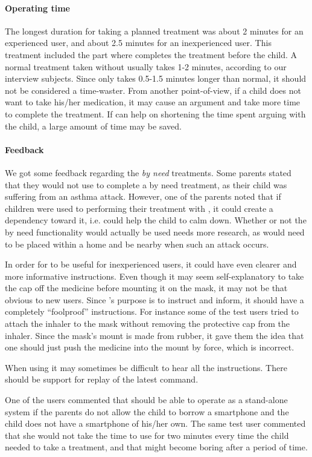 \paragraph{Operating time}

The longest duration for taking a planned treatment was about 2 minutes for an experienced user, and about 2.5 minutes for an inexperienced user. This treatment included the part where \buddy{} completes the treatment before the child. A normal treatment taken without \ab{} usually takes 1-2 minutes, according to our interview subjects. Since \ab{} only takes 0.5-1.5 minutes longer than normal, it should not be considered a time-waster. From another point-of-view, if a child does not want to take his/her medication, it may cause an argument and take more time to complete the treatment. If \ab{} can help on shortening the time spent arguing with the child, a large amount of time may be saved.      

\paragraph{Feedback}

We got some feedback regarding the \emph{by need} treatments. Some parents stated that they would not use \buddy{} to complete a by need treatment, as their child was suffering from an asthma attack. However, one of the parents noted that if children were used to performing their treatment with \buddy{}, it could create a dependency toward it, i.e. \buddy{} could help the child to calm down. Whether or not the by need functionality would actually be used needs more research, as \buddy{} would need to be placed within a home and be nearby when such an attack occurs. 

In order for \ab{} to be useful for inexperienced users, it could have even clearer and more informative instructions. Even though it may seem self-explanatory to take the cap off the medicine before mounting it on the mask, it may not be that obvious to new users. Since \ab{}'s purpose is to instruct and inform, it should have a completely ``foolproof'' instructions. For instance some of the test users tried to attach the inhaler to the mask without removing the protective cap from the inhaler. Since the mask's mount is made from rubber, it gave them the idea that one should just push the medicine into the mount by force, which is incorrect. 

When using \ab{} it may sometimes be difficult to hear all the instructions. There should be support for replay of the latest command.

One of the users commented that \ab{} should be able to operate as a stand-alone system if the parents do not allow the child to borrow a smartphone and the child does not have a smartphone of his/her own. The same test user commented that she would not take the time to use \ab{} for two minutes every time the child needed to take a treatment, and that \ab{} might become boring after a period of time.


